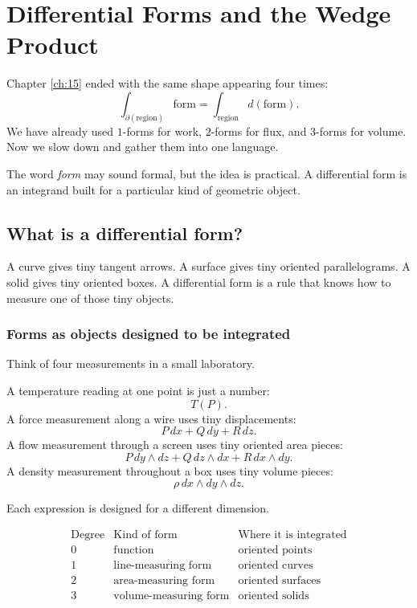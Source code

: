 
\chapter{Differential Forms and the Wedge Product}
\label{ch:16}

Chapter \ref{ch:15} ended with the same shape appearing four times:
\[
    \int_{\partial(\text{region})}\text{form}
    =
    \int_{\text{region}}d(\text{form}).
\]
We have already used \(1\)-forms for work, \(2\)-forms for flux, and \(3\)-forms for
volume.  Now we slow down and gather them into one language.

The word \emph{form} may sound formal, but the idea is practical.  A differential form is
an integrand built for a particular kind of geometric object.

\section{What is a differential form?}
\label{sec:16.1}

A curve gives tiny tangent arrows.  A surface gives tiny oriented parallelograms.  A
solid gives tiny oriented boxes.  A differential form is a rule that knows how to measure
one of those tiny objects.

\subsection{Forms as objects designed to be integrated}

Think of four measurements in a small laboratory.

A temperature reading at one point is just a number:
\[
    T(P).
\]
A force measurement along a wire uses tiny displacements:
\[
    P\,dx+Q\,dy+R\,dz.
\]
A flow measurement through a screen uses tiny oriented area pieces:
\[
    P\,dy\wedge dz+Q\,dz\wedge dx+R\,dx\wedge dy.
\]
A density measurement throughout a box uses tiny volume pieces:
\[
    \rho\,dx\wedge dy\wedge dz.
\]

Each expression is designed for a different dimension.

\[
\begin{array}{c|c|c}
\text{Degree} & \text{Kind of form} & \text{Where it is integrated} \\ \hline
0 & \text{function} & \text{oriented points}\\[1mm]
1 & \text{line-measuring form} & \text{oriented curves}\\[1mm]
2 & \text{area-measuring form} & \text{oriented surfaces}\\[1mm]
3 & \text{volume-measuring form} & \text{oriented solids}
\end{array}
\]

